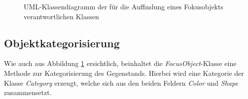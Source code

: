 \begin{figure}[H]
\centering
{}
\caption{UML-Klassendiagramm der für die Auffindung eines Fokusobjekts verantwortlichen Klassen}
\label{fig:UMLFocus}
\end{figure}

\subsection{Objektkategorisierung}

Wie auch aus Abbildung \ref{fig:UMLFocus} ersichtlich, beinhaltet die \textit{FocusObject}-Klasse eine Methode zur Kategorisierung des Gegenstands. Hierbei wird eine Kategorie der Klasse \textit{Category} erzeugt, welche sich aus den beiden Feldern \textit{Color} und \textit{Shape} zusammensetzt.

